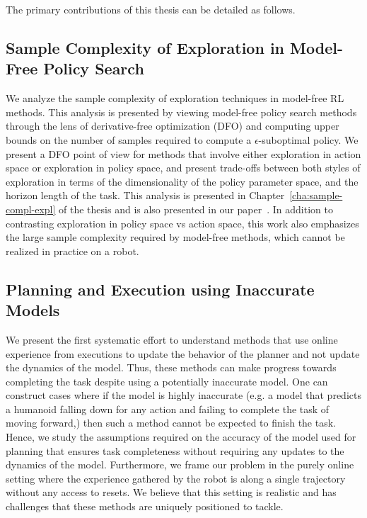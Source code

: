 The primary contributions of this thesis can be detailed as follows.

\subsection{Sample Complexity of Exploration in Model-Free Policy
  Search}
\label{sec:sample-compl-expl}
We analyze the sample complexity of exploration techniques in
  model-free RL methods. This analysis is presented by viewing model-free policy
  search methods through the lens of derivative-free optimization (DFO)
  and computing upper bounds on the number of samples
  required to compute a $\epsilon$-suboptimal policy. We present a DFO
  point of view for methods that involve either exploration in action
  space or exploration in policy space, and present trade-offs between
  both styles of exploration in terms of the dimensionality of the
  policy parameter space, and the horizon length of the task. This
  analysis is presented in Chapter~\ref{cha:sample-compl-expl} of the  
  thesis and is also presented in our paper~\cite{aistats19}. In addition
  to contrasting exploration in policy space vs action space, this
  work also emphasizes the large sample complexity required by
  model-free methods, which cannot be realized in practice on a robot.
  
\subsection{Planning and Execution using Inaccurate Models}
\label{sec:plann-exec-using}
  We present the first systematic effort to understand methods
  that use online experience from executions to update the behavior of
  the planner and not update the dynamics of the model. Thus, these
  methods can make progress towards completing the task despite using
  a potentially inaccurate model. One can construct cases where if the
  model is highly inaccurate (e.g. a model that predicts a humanoid
  falling down for any action and failing to complete the task of
  moving forward,) then such a method cannot be expected to finish the
  task. Hence, we study the assumptions required on the accuracy of
  the model used for planning that ensures task completeness without
  requiring any updates to the dynamics of the model. Furthermore, we
  frame our problem in the purely online setting where the experience
  gathered by the robot is along a single trajectory without any
  access to resets. We believe that this setting is realistic and has
  challenges that these methods are uniquely positioned to tackle.


